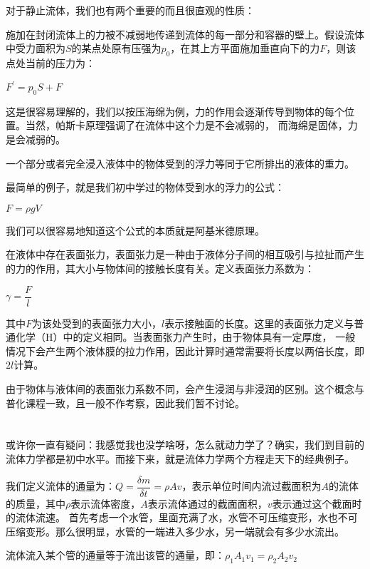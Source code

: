 对于静止流体，我们也有两个重要的而且很直观的性质：
\begin{law}
    施加在封闭流体上的力被不减弱地传递到流体的每一部分和容器的壁上。假设流体中受力面积为$S$的某点处原有压强为$p_0$，在其上方平面施加垂直向下的力$F$，则该点处当前的压力为：
    \begin{center}
        $F^{'}=p_0 S +F$
    \end{center}
\end{law}

这是很容易理解的，我们以按压海绵为例，力的作用会逐渐传导到物体的每个位置。当然，帕斯卡原理强调了在流体中这个力是不会减弱的，
而海绵是固体，力是会减弱的。
\begin{law}
    一个部分或者完全浸入液体中的物体受到的浮力等同于它所排出的液体的重力。
\end{law}

最简单的例子，就是我们初中学过的物体受到水的浮力的公式：
\begin{center}
    $F=\rho gV$
\end{center}

我们可以很容易地知道这个公式的本质就是阿基米德原理。

在液体中存在表面张力，表面张力是一种由于液体分子间的相互吸引与拉扯而产生的力的作用，其大小与物体间的接触长度有关。定义表面张力系数为：
\begin{center}
    $\gamma =\dfrac{F}{l}$
\end{center}

其中$F$为该处受到的表面张力大小，$l$表示接触面的长度。这里的表面张力定义与普通化学（H）中的定义相同。当表面张力产生时，由于物体具有一定厚度，
一般情况下会产生两个液体膜的拉力作用，因此计算时通常需要将长度以两倍长度，即$2l$计算。

由于物体与液体间的表面张力系数不同，会产生浸润与非浸润的区别。这个概念与普化课程一致，且一般不作考察，因此我们暂不讨论。
\section[流体动力学]{}
或许你一直有疑问：我感觉我也没学啥呀，怎么就动力学了？确实，我们到目前的流体力学都是初中水平。而接下来，就是流体力学两个方程走天下的经典例子。

我们定义流体的通量为：$Q=\dfrac{\delta m}{\delta t}=\rho Av$，表示单位时间内流过截面积为$A$的流体的质量，其中$\rho$表示流体密度，$A$表示流体通过的截面面积，$v$表示通过这个截面时的流体流速。
首先考虑一个水管，里面充满了水，水管不可压缩变形，水也不可压缩变形。那么很明显，水管的一端进入多少水，另一端就会有多少水流出。
\begin{law}
    流体流入某个管的通量等于流出该管的通量，即：$\rho_1 A_1 v_1=\rho_2 A_2 v_2$
\end{law}

